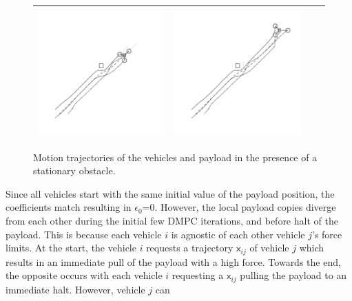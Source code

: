 \documentclass[letterpaper, 10 pt, conference]{ieeeconf}
\newcommand{\cx}{\textsf{x}}
\begin{document}
\begin{figure}[t]
\begin{tabular}[t]{|c|c|c|c|}
				\includegraphics[scale=0.6]{figures/obstacle_2_tikz_gray.pdf} &
				\includegraphics[scale=0.6]{figures/obstacle_3_tikz_gray.pdf} \\
			\hline
		\end{tabular}
	\caption{Motion trajectories of the vehicles and payload in the presence of a stationary obstacle.}
	\label{obstacle}
\end{figure}
Since all vehicles start with the same initial value of the payload position, the coefficients match resulting in $\epsilon_0$=0. However, the local payload copies diverge from each other during the initial few DMPC iterations, and before halt of the payload. This is because each vehicle $i$ is agnostic of each other vehicle $j$'s force limits. At the start, the vehicle $i$ requests a trajectory $\cx_{ij}$ of vehicle $j$ which results in an immediate pull of the payload with a high force. Towards the end, the opposite occurs with each vehicle $i$ requesting a $\cx_{ij}$ pulling the payload to an immediate halt. However, vehicle $j$ can
\end{document}

